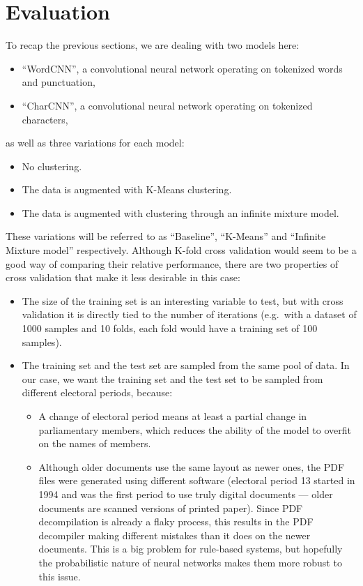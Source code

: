 \section{Evaluation}
\FloatBarrier%

To recap the previous sections, we are dealing with two models here:
\begin{itemize}
  \item ``WordCNN'', a convolutional neural network operating on tokenized words
    and punctuation,
  \item ``CharCNN'', a convolutional neural network operating on tokenized
    characters,
\end{itemize}
as well as three variations for each model:
\begin{itemize}
  \item No clustering.
  \item The data is augmented with K-Means clustering.
  \item The data is augmented with clustering through an infinite mixture model.
\end{itemize}
These variations will be referred to as ``Baseline'', ``K-Means'' and ``Infinite
Mixture model'' respectively. Although K-fold cross validation would seem to be
a good way of comparing their relative performance, there are two properties of
cross validation that make it less desirable in this case:
\begin{itemize}
  \item The size of the training set is an interesting variable to test, but
    with cross validation it is directly tied to the number of iterations (e.g.\
    with a dataset of 1000 samples and 10 folds, each fold would have a
    training set of 100 samples).
  \item The training set and the test set are sampled from the same pool of
    data. In our case, we want the training set and the test set to be sampled
    from different electoral periods, because:
    \begin{itemize}
      \item A change of electoral period means at least a partial change in
        parliamentary members, which reduces the ability of the model to 
        overfit on the names of members.
      \item Although older documents use the same layout as newer ones, the PDF
        files were generated using different software (electoral period 13 started
        in 1994 and was the first period to use truly  digital documents --- older
        documents are scanned versions of printed paper). Since PDF
        decompilation is already a flaky process, this results in the 
        PDF decompiler making different mistakes than it does on the newer
        documents. This is a big problem for rule-based systems, but hopefully the
        probabilistic nature of neural networks makes them more robust to this issue.
    \end{itemize}
\end{itemize}
